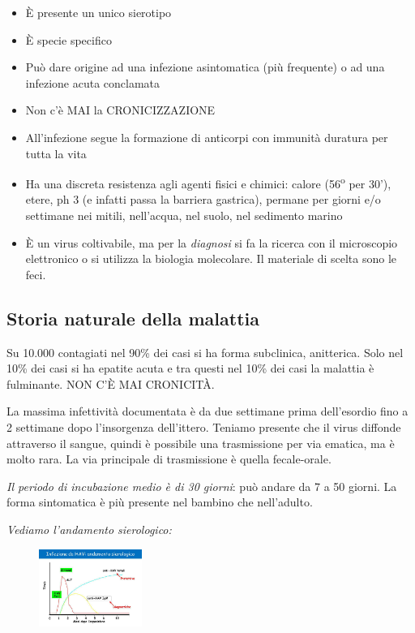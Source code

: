 \begin{itemize}
\item
  È presente un unico sierotipo
\item
  È specie specifico
\item
  Può dare origine ad una infezione asintomatica (più frequente) o ad
  una infezione acuta conclamata
\item
  Non c'è MAI la CRONICIZZAZIONE
\item
  All'infezione segue la formazione di anticorpi con immunità duratura
  per tutta la vita
\item
  Ha una discreta resistenza agli agenti fisici e chimici: calore (56\textsuperscript{o}
  per 30'), etere, ph 3 (e infatti passa la barriera gastrica), permane
  per giorni e/o settimane nei mitili, nell'acqua, nel suolo, nel
  sedimento marino
\item
  È un virus coltivabile, ma per la \emph{diagnosi} si fa la ricerca con
  il microscopio elettronico o si utilizza la biologia molecolare. Il
  materiale di scelta sono le feci.
\end{itemize}

\subsection{Storia naturale della malattia}

Su 10.000 contagiati nel 90\% dei casi si ha forma subclinica,
anitterica. Solo nel 10\% dei casi si ha epatite acuta e tra questi nel
10\% dei casi la malattia è fulminante. NON C'È MAI CRONICITÀ.

La massima infettività documentata è da due settimane prima dell'esordio
fino a 2 settimane dopo l'insorgenza dell'ittero. Teniamo presente che
il virus diffonde attraverso il sangue, quindi è possibile una
trasmissione per via ematica, ma è molto rara. La via principale di
trasmissione è quella fecale-orale.

\emph{Il periodo di incubazione medio è di 30 giorni}: può andare da 7 a
50 giorni. La forma sintomatica è più presente nel bambino che
nell'adulto.

\emph{Vediamo l'andamento sierologico:}

\begin{figure}[!ht]
\centering
	\includegraphics[width=0.3\textwidth]{12/image2.png}
	\end{figure}

